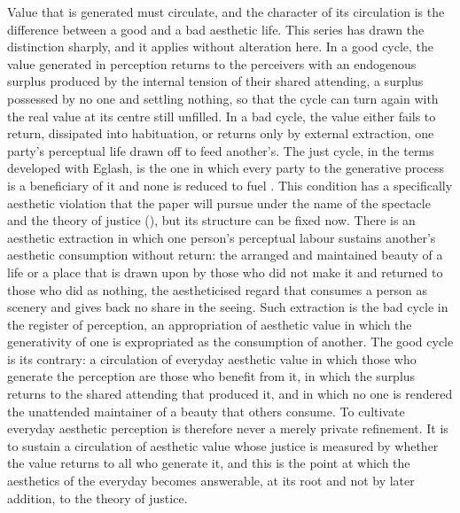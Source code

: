 Value that is generated must circulate, and the character of its circulation is the difference between a good and a bad aesthetic life. This series has drawn the distinction sharply, and it applies without alteration here. In a good cycle, the value generated in perception returns to the perceivers with an endogenous surplus produced by the internal tension of their shared attending, a surplus possessed by no one and settling nothing, so that the cycle can turn again with the real value at its centre still unfilled. In a bad cycle, the value either fails to return, dissipated into habituation, or returns only by external extraction, one party's perceptual life drawn off to feed another's. The just cycle, in the terms developed with Eglash, is the one in which every party to the generative process is a beneficiary of it and none is reduced to fuel \parencite{eglash2016}. This condition has a specifically aesthetic violation that the paper will pursue under the name of the spectacle and the theory of justice (), but its structure can be fixed now. There is an aesthetic extraction in which one person's perceptual labour sustains another's aesthetic consumption without return: the arranged and maintained beauty of a life or a place that is drawn upon by those who did not make it and returned to those who did as nothing, the aestheticised regard that consumes a person as scenery and gives back no share in the seeing. Such extraction is the bad cycle in the register of perception, an appropriation of aesthetic value in which the generativity of one is expropriated as the consumption of another. The good cycle is its contrary: a circulation of everyday aesthetic value in which those who generate the perception are those who benefit from it, in which the surplus returns to the shared attending that produced it, and in which no one is rendered the unattended maintainer of a beauty that others consume. To cultivate everyday aesthetic perception is therefore never a merely private refinement. It is to sustain a circulation of aesthetic value whose justice is measured by whether the value returns to all who generate it, and this is the point at which the aesthetics of the everyday becomes answerable, at its root and not by later addition, to the theory of justice.
